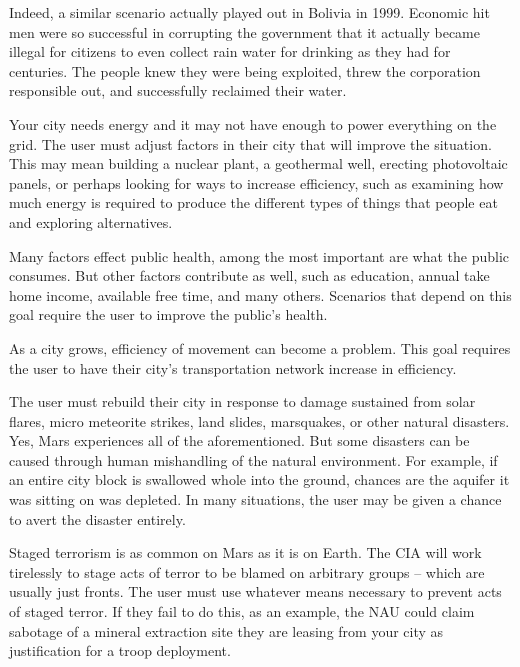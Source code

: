 Indeed, a similar scenario actually played out in Bolivia in 1999. Economic hit men were so successful in corrupting the government that it actually became illegal for citizens to even collect rain water for drinking as they had for centuries. The people knew they were being exploited, threw the corporation responsible out, and successfully reclaimed their water.


Your city needs energy and it may not have enough to power everything on the grid. The user must adjust factors in their city that will improve the situation. This may mean building a nuclear plant, a geothermal well, erecting photovoltaic panels, or perhaps looking for ways to increase efficiency, such as examining how much energy is required to produce the different types of things that people eat and exploring alternatives.


Many factors effect public health, among the most important are what the public consumes. But other factors contribute as well, such as education, annual take home income, available free time, and many others. Scenarios that depend on this goal require the user to improve the public's health.


As a city grows, efficiency of movement can become a problem. This goal requires the user to have their city's transportation network increase in efficiency.


The user must rebuild their city in response to damage sustained from solar flares, micro meteorite strikes, land slides, marsquakes, or other natural disasters. Yes, Mars experiences all of the aforementioned. But some  disasters can be caused through human mishandling of the natural environment. For example, if an entire city block is swallowed whole into the ground, chances are the aquifer it was sitting on was depleted. In many situations, the user may be given a chance to avert the disaster entirely.


Staged terrorism is as common on Mars as it is on Earth. The CIA will work tirelessly to stage acts of terror to be blamed on arbitrary groups -- which are usually just fronts. The user must use whatever means necessary to prevent acts of staged terror. If they fail to do this, as an example, the NAU could claim sabotage of a mineral extraction site they are leasing from your city as justification for a troop deployment.

